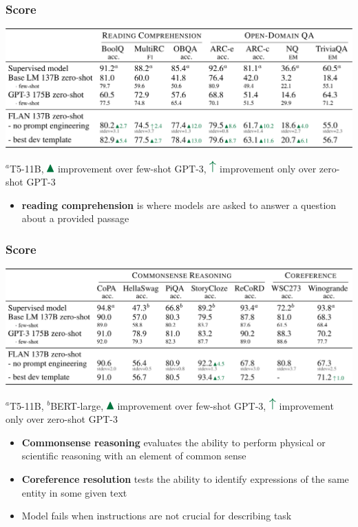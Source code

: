 \documentclass{beamer}
\begin{document}
\begin{frame}
    \frametitle{Score}
    \begin{center}
        \includegraphics[scale=1.0]{img/score_rc_qa.png}
    \end{center}
    \tiny{$^a$T5-11B, \includegraphics[scale=1.0]{img/up_arrow_1.png} improvement over few-shot GPT-3, \includegraphics[scale=1.0]{img/up_arrow_2.png} improvement only over zero-shot GPT-3}
    \begin{itemize}
    \footnotesize 
        \item \textbf{reading comprehension} is where models are asked to answer a question about a provided passage
    \end{itemize}
\end{frame}

\begin{frame}
    \frametitle{Score}
    \begin{center}
        \includegraphics[scale=1.15]{img/score_cr_c.png}
    \end{center}
    \tiny{$^a$T5-11B, $^b$BERT-large, \includegraphics[scale=1.0]{img/up_arrow_1.png} improvement over few-shot GPT-3, \includegraphics[scale=1.0]{img/up_arrow_2.png} improvement only over zero-shot GPT-3}
    \begin{itemize}
    \footnotesize 
        \item \textbf{Commonsense reasoning} evaluates the ability to perform physical or scientific reasoning with an element of common sense
        \item \textbf{Coreference resolution} tests the ability to identify expressions of the same entity in some given text
        \item Model fails when instructions are not crucial for describing task
    \end{itemize}
\end{frame}
\end{document}

